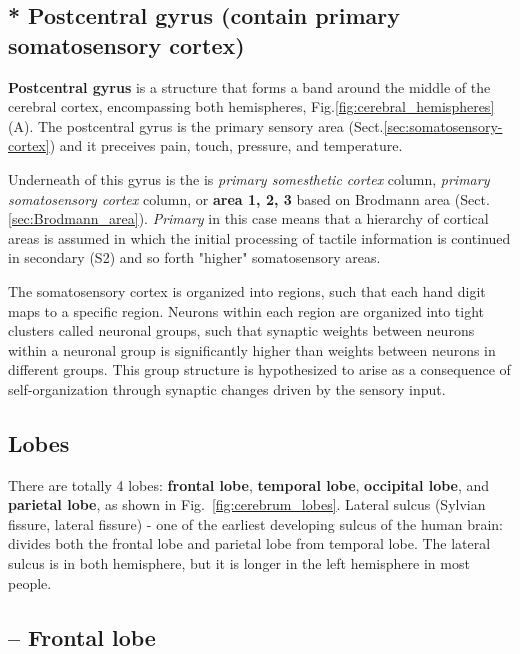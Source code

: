 \subsection{* Postcentral gyrus (contain primary somatosensory cortex)}
\label{sec:postcentral-gyrus}
\label{sec:somatosensory-cortex}

{\bf Postcentral gyrus} is a structure that forms a band around the middle of
the cerebral cortex, encompassing both hemispheres,
Fig.\ref{fig:cerebral_hemispheres}(A).
The postcentral gyrus is the primary sensory area
(Sect.\ref{sec:somatosensory-cortex}) and it preceives pain, touch, pressure,
and temperature.

Underneath of this gyrus is the is {\it primary somesthetic cortex} column, {\it
primary somatosensory cortex} column, or {\bf area 1, 2, 3} based on Brodmann
area (Sect.\ref{sec:Brodmann_area}). {\it Primary} in this case means that a
hierarchy of cortical areas is assumed in which the initial processing of
tactile information is continued in secondary (S2) and so forth "higher"
somatosensory areas.


The somatosensory cortex is organized into regions, such that each hand digit
maps to a specific region. Neurons within each region are organized into tight
clusters called neuronal groups, such that synaptic weights between neurons
within a neuronal group is significantly higher than weights between neurons in
different groups. This group structure is hypothesized to arise as a consequence
of self-organization through synaptic changes driven by the sensory input.



\subsection{Lobes}
\label{sec:lobes}

There are totally 4 lobes: {\bf frontal lobe}, {\bf temporal lobe}, {\bf
occipital lobe}, and {\bf parietal lobe}, as shown in
Fig.~\ref{fig:cerebrum_lobes}.
Lateral sulcus (Sylvian fissure, lateral fissure) - one of the earliest
developing sulcus of the human brain: divides both the frontal lobe and parietal
lobe from temporal lobe. The lateral sulcus is in both hemisphere, but it is
longer in the left hemisphere in most people.

\subsection{-- Frontal lobe}
\label{sec:frontal-lobe}

